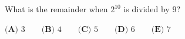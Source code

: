What is the remainder when $2^{10}$ is divided by $9$?

$\textbf{(A) }3\qquad\textbf{(B) }4\qquad\textbf{(C) }5\qquad\textbf{(D) }6\qquad\textbf{(E) }7$
